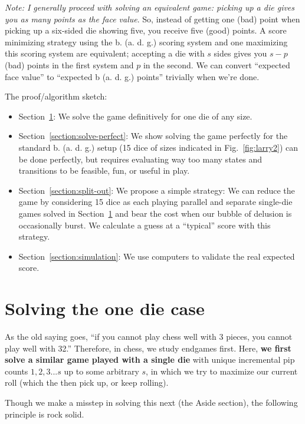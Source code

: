 \documentclass[11pt, oneside]{article} 	%
\begin{document}
\emph{Note: I generally proceed with solving an equivalent game: picking up a die gives you as many points as the face value}. So, instead of getting one (bad) point when picking up a six-sided die showing five, you receive five (good) points. A score minimizing strategy using the b. (a. d. g.) scoring system and one maximizing this scoring system are equivalent; accepting a die with $s$ sides gives you $s-p$ (bad) points in the first system and $p$ in the second. We can convert ``expected face value'' to ``expected b (a. d. g.) points'' trivially when we're done.


The proof/algorithm sketch:
\begin{itemize}
\item Section~\ref{section:solve-one}: We  solve the game definitively for one die of any size.
\item Section~\ref{section:solve-perfect}: We show solving the game perfectly for the standard b. (a. d. g.) setup (15 dice of sizes indicated in Fig.~\ref{fig:larry2}) can be done perfectly, but requires evaluating way too many states and transitions to be feasible, fun, or useful in play.
\item Section~\ref{section:split-out}: We propose a simple strategy: We can reduce the game by considering 15 dice as each playing parallel and separate single-die games solved in Section~\ref{section:solve-one} and bear the cost when our bubble of delusion is occasionally burst. We calculate a guess at a ``typical'' score with this strategy.
\item Section~\ref{section:simulation}: We use computers to validate the real expected score.
\end{itemize}

\section{Solving the one die case} \label{section:solve-one}



As the old saying goes, ``if you cannot play chess well with 3 pieces, you cannot play well with 32.''  Therefore, in chess, we study endgames first. Here, \textbf{we first solve a similar game played with a single die} with unique incremental pip counts $1, 2, 3 ... s$ up to some arbitrary $s$, in which we try to maximize our current roll (which the then pick up, or keep rolling).

Though we make a misstep in solving this next (the Aside section), the following principle is rock solid.
\end{document}
